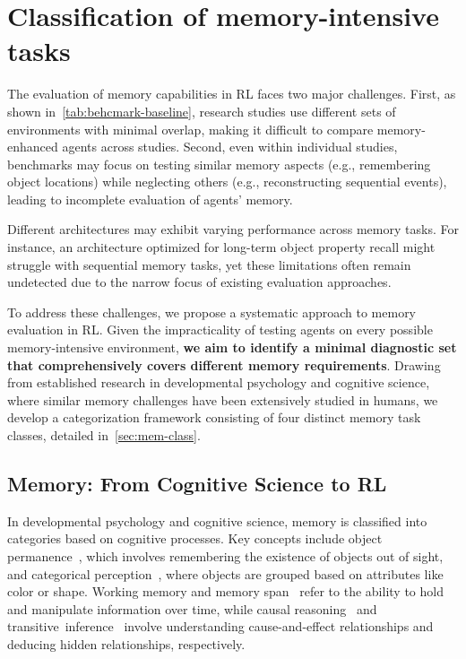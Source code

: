 \section{Classification of memory-intensive tasks}
\label{sec:tasks-classification}

The evaluation of memory capabilities in RL faces two major challenges. First, as shown in~\autoref{tab:behcmark-baseline}, research studies use different sets of environments with minimal overlap, making it difficult to compare memory-enhanced agents across studies. Second, even within individual studies, benchmarks may focus on testing similar memory aspects (e.g., remembering object locations) while neglecting others (e.g., reconstructing sequential events), leading to incomplete evaluation of agents’ memory.

Different architectures may exhibit varying performance across memory tasks. For instance, an architecture optimized for long-term object property recall might struggle with sequential memory tasks, yet these limitations often remain undetected due to the narrow focus of existing evaluation approaches.

To address these challenges, we propose a systematic approach to memory evaluation in RL. Given the impracticality of testing agents on every possible memory-intensive environment, \textbf{we aim to identify a minimal diagnostic set that comprehensively covers different memory requirements}. Drawing from established research in developmental psychology and cognitive science, where similar memory challenges have been extensively studied in humans, we develop a categorization framework consisting of four distinct memory task classes, detailed in~\autoref{sec:mem-class}.

\subsection{Memory: From Cognitive Science to RL}
In developmental psychology and cognitive science, memory is classified into categories based on cognitive processes. Key concepts include object permanence~\citep{piaget1952origins}, which involves remembering the existence of objects out of sight, and categorical perception~\citep{liberman1957discrimination}, where objects are grouped based on attributes like color or shape. Working memory \citep{baddeley1992working} and memory span~\citep{daneman1980individual} refer to the ability to hold and manipulate information over time, while causal reasoning~\citep{kuhn2012development} and \mbox{transitive inference}~\citep{heckers2004hippocampal} involve understanding cause-and-effect relationships and deducing hidden relationships, respectively.

